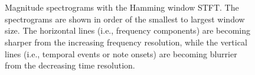 \documentclass[report.tex]{subfiles}
\begin{document}
\begin{figure}[ht]
	\centering
	\\
	\\
	\caption{Magnitude spectrograms with the Hamming window STFT. The spectrograms are shown in order of the smallest to largest window size. The horizontal lines (i.e., frequency components) are becoming sharper from the increasing frequency resolution, while the vertical lines (i.e., temporal events or note onsets) are becoming blurrier from the decreasing time resolution.}
	\label{fig:stfts1}
\end{figure}
\end{document}
